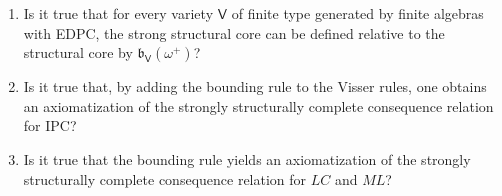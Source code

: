 \documentclass[submission,copyright,creativecommons]{eptcs}
\theoremstyle{definition}
\newcommand{\vv}[1]{\mathsf {#1}}
\newcommand{\WsV}{\mathfrak{b}_\vv V}
\begin{document}
\begin{enumerate}
	\item Is it true that for every variety $\vv V$ of finite type generated by finite algebras with EDPC, the strong structural core can be defined relative to the structural core by $\WsV(\omega^+)$?
	
	\item Is it true that, by adding the bounding rule to the Visser rules, one obtains an axiomatization of the strongly structurally complete consequence relation for IPC?
	
	\item Is it true that the bounding rule yields an axiomatization of the strongly structurally complete consequence relation for $LC$ and $ML$?
\end{enumerate}
\end{document}
